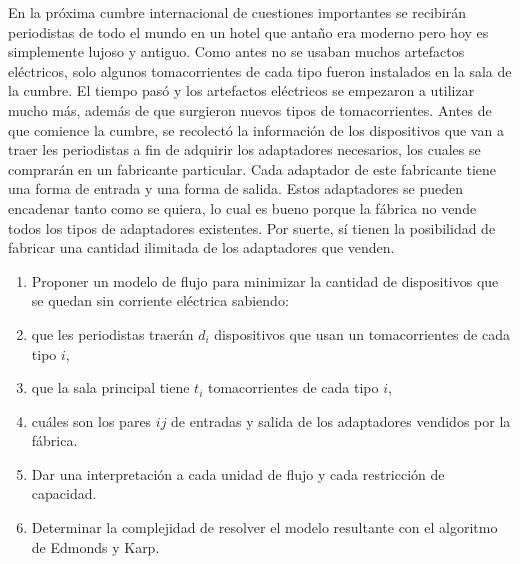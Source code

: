 
 \item En la próxima cumbre internacional de cuestiones importantes se recibirán periodistas de todo el mundo en un hotel que antaño era moderno pero hoy es simplemente lujoso y antiguo.  Como antes no se usaban muchos artefactos eléctricos, solo algunos tomacorrientes de cada tipo fueron instalados en la sala de la cumbre.  El tiempo pasó y los artefactos eléctricos se empezaron a utilizar mucho más, además de que surgieron nuevos tipos de tomacorrientes.  Antes de que comience la cumbre, se recolectó la información de los dispositivos que van a traer les periodistas a fin de adquirir los adaptadores necesarios, los cuales se comprarán en un fabricante particular.  Cada adaptador de este fabricante tiene una forma de entrada y una forma de salida. Estos adaptadores se pueden encadenar tanto como se quiera, lo cual es bueno porque la fábrica no vende todos los tipos de adaptadores existentes. Por suerte, sí tienen la posibilidad de fabricar una cantidad ilimitada de los adaptadores que venden.  
 \begin{enumerate}[label=$\alph*)$,ref=$\alph*)$]
  \item  Proponer un modelo de flujo para minimizar la cantidad de dispositivos que se quedan sin corriente eléctrica sabiendo:
   \item que les periodistas traerán $d_i$ dispositivos que usan un tomacorrientes de cada tipo $i$,
   \item que la sala principal tiene $t_i$ tomacorrientes de cada tipo $i$,
   \item cuáles son los pares $ij$ de entradas y salida de los adaptadores vendidos por la fábrica.
  \item Dar una interpretación a cada unidad de flujo y cada restricción de capacidad.
  \item Determinar la complejidad de resolver el modelo resultante con el algoritmo de Edmonds y Karp.
 \end{enumerate}


